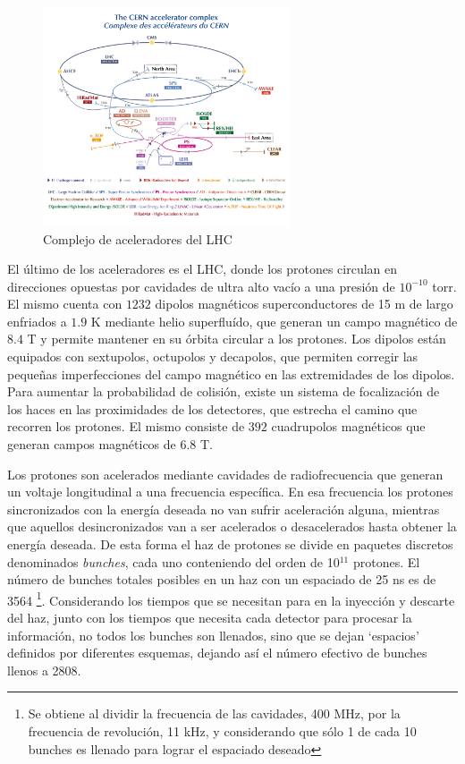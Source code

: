 \begin{figure}
  \centering
  \includegraphics[width=0.65\textwidth]{images/LHC_complex.png}
  \caption{Complejo de aceleradores del LHC}
  \label{LHC_complex}
\end{figure}

El último de los aceleradores es el LHC, donde los protones circulan en direcciones opuestas por cavidades de ultra alto vacío a una presión de $10^{-10}$ torr. El mismo cuenta con $1232$ dipolos magnéticos superconductores de 15 m de largo enfriados a $1.9$ K mediante helio superfluído, que generan un campo magnético de $8.4$ T y permite mantener en su órbita circular a los protones. Los dipolos están equipados con sextupolos, octupolos y decapolos, que permiten corregir las pequeñas imperfecciones del campo magnético en las extremidades de los dipolos. Para aumentar la probabilidad de colisión, existe un sistema de focalización de los haces en las proximidades de los detectores, que estrecha el camino que recorren los protones. El mismo consiste de $392$ cuadrupolos magnéticos que generan campos magnéticos de $6.8$ T. 

Los protones son acelerados mediante cavidades de radiofrecuencia que generan un voltaje longitudinal a una frecuencia específica. En esa frecuencia los protones sincronizados con la energía deseada no van sufrir aceleración alguna, mientras que aquellos desincronizados van a ser acelerados o desacelerados hasta obtener la energía deseada. De esta forma el haz de protones se divide en paquetes discretos denominados \textit{bunches}, cada uno conteniendo del orden de 10$^{11}$ protones. El número de bunches totales posibles en un haz con un espaciado de 25 ns es de 3564 \footnote{Se obtiene al dividir la frecuencia de las cavidades, 400 MHz, por la frecuencia de revolución, 11 kHz, y considerando que sólo 1 de cada 10 bunches es llenado para lograr el espaciado deseado}. Considerando los tiempos que se necesitan para en la inyección y descarte del haz, junto con los tiempos que necesita cada detector para procesar la información, no todos los bunches son llenados, sino que se dejan `espacios' definidos por diferentes esquemas, dejando así el número efectivo de bunches llenos a 2808.

